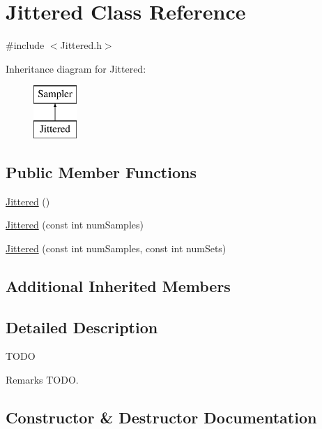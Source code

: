 \hypertarget{class_jittered}{}\section{Jittered Class Reference}
\label{class_jittered}


{\ttfamily \#include $<$Jittered.\+h$>$}

Inheritance diagram for Jittered\+:\begin{figure}[H]
\begin{center}
\leavevmode
\includegraphics[height=2.000000cm]{class_jittered}
\end{center}
\end{figure}
\subsection*{Public Member Functions}
\begin{DoxyCompactItemize}
\item 
\hyperlink{class_jittered_af6b4c1f329b76db2e866145b7b506bc0}{Jittered} ()
\item 
\hyperlink{class_jittered_a140ae4562e7db9133bb1953e2f8e5ea8}{Jittered} (const int num\+Samples)
\item 
\hyperlink{class_jittered_a37413740ae17ca91a2dd02375a5683ce}{Jittered} (const int num\+Samples, const int num\+Sets)
\end{DoxyCompactItemize}
\subsection*{Additional Inherited Members}


\subsection{Detailed Description}
T\+O\+DO \begin{DoxyRemark}{Remarks}
T\+O\+DO. 
\end{DoxyRemark}


\subsection{Constructor \& Destructor Documentation}
\hypertarget{class_jittered_af6b4c1f329b76db2e866145b7b506bc0}{}\label{class_jittered_af6b4c1f329b76db2e866145b7b506bc0} 
